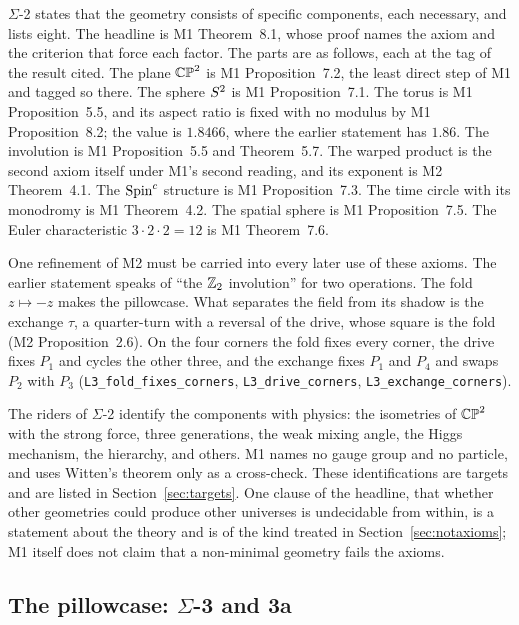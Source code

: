 \documentclass[11pt,a4paper]{article}
\theoremstyle{plain}
\theoremstyle{definition}
\theoremstyle{remark}
\newcommand{\Sig}[1]{$\Sigma$-#1}
\begin{document}
\Sig{2} states that the geometry consists of specific components, each necessary, and lists eight. The headline is M1 Theorem~8.1, whose proof names the axiom and the criterion that force each factor. The parts are as follows, each at the tag of the result cited. The plane $\mathbb{CP}^2$ is M1 Proposition~7.2, the least direct step of M1 and tagged so there. The sphere $S^2$ is M1 Proposition~7.1. The torus is M1 Proposition~5.5, and its aspect ratio is fixed with no modulus by M1 Proposition~8.2; the value is $1.8466$, where the earlier statement has $1.86$. The involution is M1 Proposition~5.5 and Theorem~5.7. The warped product is the second axiom itself under M1's second reading, and its exponent is M2 Theorem~4.1. The $\text{Spin}^c$ structure is M1 Proposition~7.3. The time circle with its monodromy is M1 Theorem~4.2. The spatial sphere is M1 Proposition~7.5. The Euler characteristic $3\cdot2\cdot2=12$ is M1 Theorem~7.6.

One refinement of M2 must be carried into every later use of these axioms. The earlier statement speaks of ``the $\mathbb{Z}_2$ involution'' for two operations. The fold $z\mapsto-z$ makes the pillowcase. What separates the field from its shadow is the exchange $\tau$, a quarter-turn with a reversal of the drive, whose square is the fold (M2 Proposition~2.6). On the four corners the fold fixes every corner, the drive fixes $P_{1}$ and cycles the other three, and the exchange fixes $P_{1}$ and $P_{4}$ and swaps $P_{2}$ with $P_{3}$ (\texttt{L3\_fold\_fixes\_corners}, \texttt{L3\_drive\_corners}, \texttt{L3\_exchange\_corners}).

The riders of \Sig{2} identify the components with physics: the isometries of $\mathbb{CP}^2$ with the strong force, three generations, the weak mixing angle, the Higgs mechanism, the hierarchy, and others. M1 names no gauge group and no particle, and uses Witten's theorem only as a cross-check. These identifications are targets and are listed in Section~\ref{sec:targets}. One clause of the headline, that whether other geometries could produce other universes is undecidable from within, is a statement about the theory and is of the kind treated in Section~\ref{sec:notaxioms}; M1 itself does not claim that a non-minimal geometry fails the axioms.

\subsection{The pillowcase: \texorpdfstring{$\Sigma$}{Sigma}-3 and 3a}\label{sec:sigma3}
\end{document}
